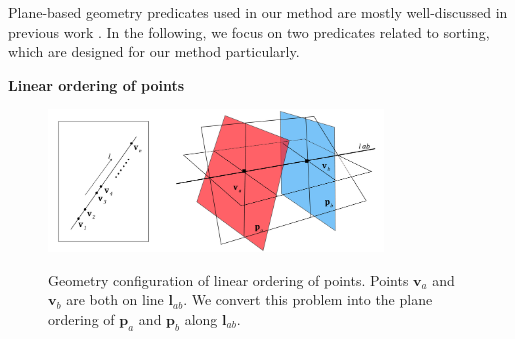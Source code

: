 \documentclass[10pt,journal,compsoc]{IEEEtran}
\begin{document}

\label{sec:substrates}
Plane-based geometry predicates used in our method are mostly well-discussed in previous work \cite{bernstein2009fast,banerjee1996topologically}. In the following, we focus on two predicates related to sorting, which are designed for our method particularly.

\vspace{0.5em}
\noindent \textbf{Linear ordering of points}

\begin{figure}
  \centering
  \includegraphics[width=3.5in]{twopointoneline}\\
  \caption{Geometry configuration of linear ordering of points. Points $\bm{v}_a$ and $\bm{v}_b$ are both on line $\bm{l}_{ab}$. We convert this problem into the plane ordering of $\bm{p}_a$ and $\bm{p}_b$ along $\bm{l}_{ab}$.}\label{fig:twopointoneline}
\end{figure}
\end{document}
